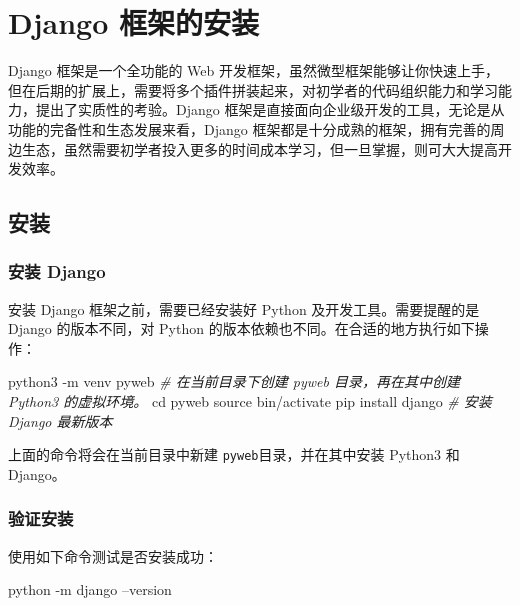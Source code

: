 \documentclass[]{ctexbook}
\newenvironment{Shaded}{\begin{snugshade}}{\end{snugshade}}
\newcommand{\BuiltInTok}[1]{#1}
\newcommand{\CommentTok}[1]{\textcolor[rgb]{0.56,0.35,0.01}{\textit{#1}}}
\newcommand{\ExtensionTok}[1]{#1}
\newcommand{\NormalTok}[1]{#1}
\begin{document}
\hypertarget{django}{%
\chapter{Django 框架的安装}\label{django}}

Django 框架是一个全功能的 Web 开发框架，虽然微型框架能够让你快速上手，但在后期的扩展上，需要将多个插件拼装起来，对初学者的代码组织能力和学习能力，提出了实质性的考验。Django 框架是直接面向企业级开发的工具，无论是从功能的完备性和生态发展来看，Django 框架都是十分成熟的框架，拥有完善的周边生态，虽然需要初学者投入更多的时间成本学习，但一旦掌握，则可大大提高开发效率。

\hypertarget{ux5b89ux88c5-2}{%
\section{安装}\label{ux5b89ux88c5-2}}

\hypertarget{ux5b89ux88c5-django}{%
\subsection{安装 Django}\label{ux5b89ux88c5-django}}

安装 Django 框架之前，需要已经安装好 Python 及开发工具。需要提醒的是 Django 的版本不同，对 Python 的版本依赖也不同。在合适的地方执行如下操作：

\begin{Shaded}
\begin{Highlighting}[]
\ExtensionTok{python3}\NormalTok{ -m venv pyweb }\CommentTok{# 在当前目录下创建 pyweb 目录，再在其中创建 Python3 的虚拟环境。}
\BuiltInTok{cd}\NormalTok{ pyweb}
\BuiltInTok{source}\NormalTok{ bin/activate}
\ExtensionTok{pip}\NormalTok{ install django    }\CommentTok{# 安装 Django 最新版本}
\end{Highlighting}
\end{Shaded}

上面的命令将会在当前目录中新建 \texttt{pyweb}目录，并在其中安装 Python3 和 Django。

\hypertarget{ux9a8cux8bc1ux5b89ux88c5}{%
\subsection{验证安装}\label{ux9a8cux8bc1ux5b89ux88c5}}

使用如下命令测试是否安装成功：

\begin{Shaded}
\begin{Highlighting}[]
\ExtensionTok{python}\NormalTok{ -m django --version}
\end{Highlighting}
\end{Shaded}
\end{document}
